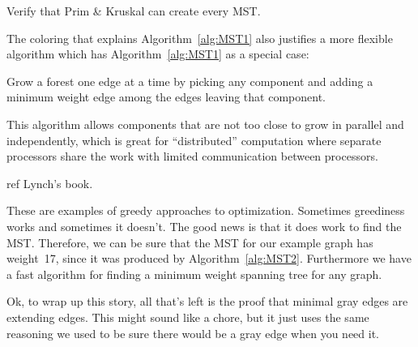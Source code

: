 \begin{editingnotes}
Verify that Prim \& Kruskal can create every MST.
\end{editingnotes}

The coloring that explains Algorithm~\ref{alg:MST1} also justifies a more
flexible algorithm which has Algorithm~\ref{alg:MST1} as a special case:
\begin{algorithm}\label{alg:MST3}
  Grow a forest one edge at a time by picking any component and adding a
  minimum weight edge among the edges leaving that component.
\end{algorithm}
This algorithm allows components that are not too close to grow in
parallel and independently, which is great for ``distributed'' computation
where separate processors share the work with limited communication
between processors.

\begin{editingnotes}
ref Lynch's book.
\end{editingnotes}

These are examples of greedy approaches to optimization.  Sometimes
greediness works and sometimes it doesn't.  The good news is that it
does work to find the MST.  Therefore, we can be sure that the MST for
our example graph has weight~17, since it was produced by
Algorithm~\ref{alg:MST2}.  Furthermore we have a fast algorithm for
finding a minimum weight spanning tree for any graph.

Ok, to wrap up this story, all that's left is the proof that minimal
gray edges are extending edges.  This might sound like a chore, but it
just uses the same reasoning we used to be sure there would be a gray
edge when you need it.

